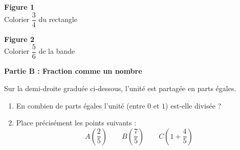 \documentclass[a4paper]{book}
\begin{document}
{\begin{exercice}
        \medskip
        \begin{minipage}{0.45\textwidth}
            \centering
            \textbf{Figure 1}\\
            Colorier $\dfrac{3}{4}$ du rectangle\\
            \vspace{0.3cm}
        \end{minipage}
        \hfill
        \begin{minipage}{0.45\textwidth}
            \centering
            \textbf{Figure 2}\\
            Colorier $\dfrac{5}{6}$ de la bande\\
            \vspace{0.3cm}
        \end{minipage}
        
\newpage
        
        \textbf{Partie B : Fraction comme un nombre}
        
        Sur la demi-droite graduée ci-dessous, l'unité est partagée en parts égales.
        \begin{enumerate}
            \item En combien de parts égales l'unité (entre $0$ et $1$) est-elle divisée ? \dotfill
            \item Place précisément les points suivants : 
            $$A\left(\dfrac{2}{5}\right) \qquad B\left(\dfrac{7}{5}\right) \qquad C\left(1 + \dfrac{4}{5}\right)$$
        \end{enumerate}
        
        \vspace{0.4cm}
        \noindent
    \end{exercice}


}
\end{document}
